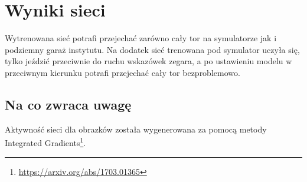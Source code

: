 \chapter{Wyniki sieci}
Wytrenowana sieć potrafi przejechać zarówno cały tor na symulatorze jak i
podziemny garaż instytutu. Na dodatek sieć trenowana pod symulator uczyła się,
tylko jeździć przeciwnie do ruchu wskazówek zegara, a po ustawieniu modelu w przeciwnym
kierunku potrafi przejechać cały tor bezproblemowo.

\section{Na co zwraca uwagę}
Aktywność sieci dla obrazków została wygenerowana za pomocą metody
Integrated Gradients\footnote{\href{https://arxiv.org/abs/1703.01365}{https://arxiv.org/abs/1703.01365}}.

